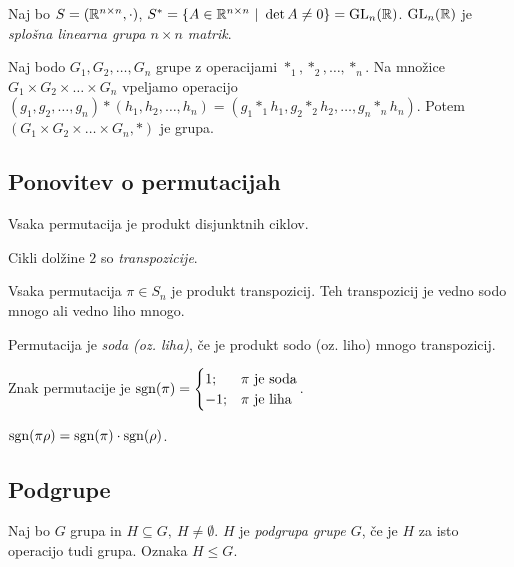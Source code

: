 \begin{primer}
    Naj bo $S = (\mathbb{R}^{n \times n}, \cdot)$, $S^* = \left\{A \in \mathbb{R}^{n \times n} \ | \ \det A \neq 0\right\} = \operatorname{GL}_n(\mathbb{R})$. $\operatorname{GL}_n(\mathbb{R})$ je \emph{splošna linearna grupa $n \times n$ matrik}.
\end{primer}

\begin{zgled}
    Naj bodo $G_1, G_2, \ldots, G_n$ grupe z operacijami $*_1, *_2, \ldots, *_n$. Na množice $G_1 \times G_2 \times \ldots \times G_n$ vpeljamo operacijo $(g_1, g_2, \ldots, g_n) * (h_1, h_2, \ldots, h_n) = (g_1 *_1 h_1, g_2 *_2 h_2, \ldots, g_n *_n h_n)$. Potem $(G_1 \times G_2 \times \ldots \times G_n, *)$ je grupa. 
\end{zgled}

\subsection{Ponovitev o permutacijah}
\begin{izrek}
    Vsaka permutacija je produkt disjunktnih ciklov.
\end{izrek}

\begin{definicija}
    Cikli dolžine $2$ so \emph{transpozicije}.
\end{definicija}

\begin{trditev}
    Vsaka permutacija $\pi \in S_n$ je produkt transpozicij. Teh transpozicij je vedno sodo mnogo ali vedno liho mnogo.
\end{trditev}

\begin{definicija}
    Permutacija je \emph{soda (oz. liha)}, če je produkt sodo (oz. liho) mnogo transpozicij.
\end{definicija}

\begin{definicija}
    Znak permutacije je $\operatorname{sgn}(\pi) = \begin{cases}
        1; &\pi \text{ je soda} \\
        -1; &\pi \text{ je liha}
    \end{cases}$.
\end{definicija}

\begin{trditev}
    $\operatorname{sgn}(\pi \rho) = \operatorname{sgn}(\pi) \cdot \operatorname{sgn}(\rho)$.
\end{trditev}

\subsection{Podgrupe}
\begin{definicija}
    Naj bo $G$ grupa in $H \subseteq G, \ H \neq \emptyset$. $H$ je \emph{podgrupa grupe $G$}, če je $H$ za isto operacijo tudi grupa. Oznaka $H \leq G$.
\end{definicija}

